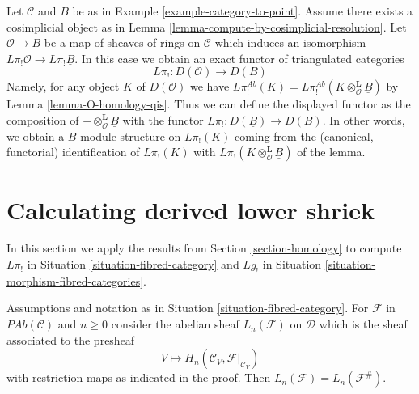 \begin{remark}
\label{remark-O-homology-B-homology-general}
Let $\mathcal{C}$ and $B$ be as in Example \ref{example-category-to-point}.
Assume there exists a cosimplicial object as in
Lemma \ref{lemma-compute-by-cosimplicial-resolution}.
Let $\mathcal{O} \to \underline{B}$ be a map of sheaves of rings on
$\mathcal{C}$ which induces an isomorphism
$L\pi_!\mathcal{O} \to L\pi_!\underline{B}$.
In this case we obtain an exact functor of triangulated categories
$$
L\pi_! : D(\mathcal{O}) \longrightarrow D(B)
$$
Namely, for any object $K$ of $D(\mathcal{O})$ we have
$L\pi^{\textit{Ab}}_!(K) =
L\pi^{\textit{Ab}}_!(K \otimes_{\mathcal{O}}^\mathbf{L} \underline{B})$
by Lemma \ref{lemma-O-homology-qis}.
Thus we can define the displayed functor as the composition of
$- \otimes^\mathbf{L}_\mathcal{O} \underline{B}$ with the functor
$L\pi_! : D(\underline{B}) \to D(B)$.
In other words, we obtain a $B$-module structure on $L\pi_!(K)$ coming
from the (canonical, functorial) identification of $L\pi_!(K)$ with
$L\pi_!(K \otimes_\mathcal{O}^\mathbf{L} \underline{B})$ of the lemma.
\end{remark}







\section{Calculating derived lower shriek}
\label{section-calculate}

\noindent
In this section we apply the results from
Section \ref{section-homology}
to compute
$L\pi_!$ in Situation \ref{situation-fibred-category} and
$Lg_!$ in Situation \ref{situation-morphism-fibred-categories}.

\begin{lemma}
\label{lemma-compute-left-derived-pi-shriek-pre}
Assumptions and notation as in Situation \ref{situation-fibred-category}.
For $\mathcal{F}$ in $\textit{PAb}(\mathcal{C})$ and $n \geq 0$
consider the abelian sheaf $L_n(\mathcal{F})$ on $\mathcal{D}$
which is the sheaf associated to the presheaf
$$
V \longmapsto H_n(\mathcal{C}_V, \mathcal{F}|_{\mathcal{C}_V})
$$
with restriction maps as indicated in the proof. Then
$L_n(\mathcal{F}) = L_n(\mathcal{F}^\#)$.
\end{lemma}

